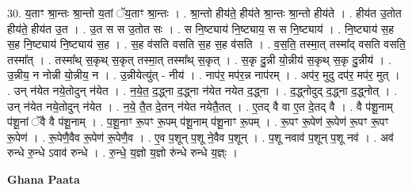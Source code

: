 \documentclass[17pt]{extarticle}
\begin{document}
30. य॒ताꣳ श्रा॒न्तः श्रा॒न्तो य॒तां ॅय॒ताꣳ श्रा॒न्तः । . श्रा॒न्तो हीय॑ते॒ हीय॑ते श्रा॒न्तः श्रा॒न्तो हीय॑ते । . हीय॑त उ॒तोत हीय॑ते॒ हीय॑त उ॒त । . उ॒त स स उ॒तोत सः । . स नि॒ष्ट्याय॑ नि॒ष्ट्याय॒ स स नि॒ष्ट्याय॑ । . नि॒ष्ट्याय॑ स॒ह स॒ह नि॒ष्ट्याय॑ नि॒ष्ट्याय॑ स॒ह । . स॒ह व॑सति वसति स॒ह स॒ह व॑सति । . व॒स॒ति॒ तस्मा॒त् तस्मा᳚द् वसति वसति॒ तस्मा᳚त् । . तस्मा᳚थ् स॒कृथ् स॒कृत् तस्मा॒त् तस्मा᳚थ् स॒कृत् । . स॒कृ दु॒न्नी यो॒न्नीय॑ स॒कृथ् स॒कृ दु॒न्नीय॑ । . उ॒न्नीय॒ न नोन्नी यो॒न्नीय॒ न । . उ॒न्नीयेत्यु॑त् - नीय॑ । . नाप॑र॒ मप॑र॒न्न नाप॑रम् । . अप॑र॒ मुदु दप॑र॒ मप॑र॒ मुत् । . उन् न॑येत नये॒तोदुन् न॑येत । . न॒ये॒त॒ द॒द्ध्ना द॒द्ध्ना न॑येत नयेत द॒द्ध्ना । . द॒द्ध्नोदुद् द॒द्ध्ना द॒द्ध्नोत् । . उन् न॑येत नये॒तोदुन् न॑येत । . न॒ये॒ तै॒त दे॒तन् न॑येत नयेतै॒तत् । . ए॒तद् वै वा ए॒त दे॒तद् वै । . वै प॑शू॒नाम् प॑शू॒नां ॅवै वै प॑शू॒नाम् । . प॒शू॒नाꣳ रू॒पꣳ रू॒पम् प॑शू॒नाम् प॑शू॒नाꣳ रू॒पम् । . रू॒पꣳ रू॒पेण॑ रू॒पेण॑ रू॒पꣳ रू॒पꣳ रू॒पेण॑ । . रू॒पेणै॒वैव रू॒पेण॑ रू॒पेणै॒व । . ए॒व प॒शून् प॒शू ने॒वैव प॒शून् । . प॒शू नवाव॑ प॒शून् प॒शू नव॑ । . अव॑ रुन्धे रु॒न्धे ऽवाव॑ रुन्धे । . रु॒न्धे॒ य॒ज्ञो य॒ज्ञो रु॑न्धे रुन्धे य॒ज्ञ्ः । \newline

\textbf{Ghana Paata } \newline
\end{document}
